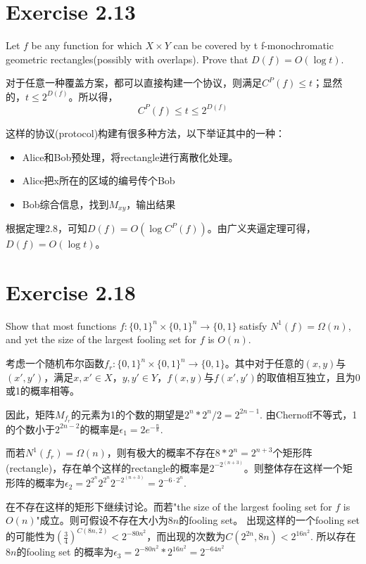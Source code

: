 \documentclass[13pt, fleqn, a4paper]{report}
\begin{document}
\section*{Exercise 2.13}
Let $f$ be any function for which $X \times Y$ can be covered by t f-monochromatic geometric rectangles(possibly with overlaps). Prove that $D(f) = O(\log{t})$.

对于任意一种覆盖方案，都可以直接构建一个协议，则满足$C^P(f) \leq t$；显然的，$t \leq 2^{D(f)}$。所以得，$$C^P(f) \leq t \leq 2^{D(f)}$$

这样的协议(protocol)构建有很多种方法，以下举证其中的一种：
\begin{itemize}
\item Alice和Bob预处理，将rectangle进行离散化处理。
\item Alice把x所在的区域的编号传个Bob
\item Bob综合信息，找到$M_{xy}$，输出结果
\end{itemize}

根据定理2.8，可知$D(f) = O(\log{C^P(f)})$。由广义夹逼定理可得，$D(f) = O(\log{t})$。

\section*{Exercise 2.18}
Show that most functions $f : \{0,1\}^n \times \{0,1\}^n \rightarrow \{0,1\} \;$satisfy $N^1(f) = \Omega(n)$, and yet the size of the largest fooling set for $f$ is $O(n)$.

考虑一个随机布尔函数$f_r : \{0, 1\}^n \times \{0, 1\}^n \rightarrow \{0, 1\}$。其中对于任意的$(x,y)$与$(x',y')$，满足$x,x' \in X$，$y,y' \in Y$，$f(x,y)$与$f(x',y')$的取值相互独立，且为0或1的概率相等。

因此，矩阵$M_{f_r}$的元素为1的个数的期望是$2^n*2^n / 2= 2^{2n - 1}$. 由Chernoff不等式，1的个数小于$2^{2n - 2}$的概率是$\epsilon_1 = 2e^{-\frac{n}{8}}$. 

而若$N^1(f_r) = \Omega(n)$，则有极大的概率不存在$8*2^n = 2^{n + 3}$个矩形阵(rectangle)，存在单个这样的rectangle的概率是$2^{-2^{(n+3)}}$。则整体存在这样一个矩形阵的概率为$\epsilon_2 = 2^{2^n}2^{2^n}2^{-2^{(n+3)}} = 2^{-6 \cdot 2^{n}}$.

在不存在这样的矩形下继续讨论。而若"the size of the largest fooling set for $f$ is $O(n)$"成立。则可假设不存在大小为$8n$的fooling set。
出现这样的一个fooling set的可能性为$(\frac{3}{4})^{C(8n, 2)} < 2^{-80 n^2}$，而出现的次数为$C(2^{2n}, 8n) < 2^{16 n^2}$. 所以存在$8n$的fooling set 的概率为$\epsilon_3 = 2^{-80 n^2} * 2^{16 n^2} = 2^{-64 n^2}$
\end{document}

